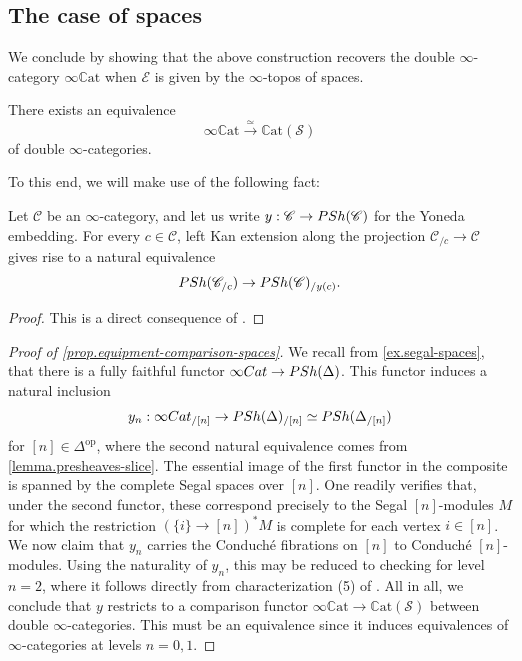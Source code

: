 \documentclass[a4paper, 11pt]{amsart}
\numberwithin{theorem}{section}
\theoremstyle{definition}
\newcommand{\cat}[1]{\textup{#1}}
\newcommand{\op}{\mathrm{op}}
\newcommand{\Cat}{\cat{Cat}}
\renewcommand{\S}{\mathscr{S}}
\newcommand{\C}{\mathscr{C}}
\newcommand{\E}{\mathscr{E}}
\newcommand{\PSh}{\cat{PSh}}
\newcommand{\CCAT}{\mathbb{C}\mathrm{at}}
\begin{document}
\subsection{The case of spaces}
We conclude by showing that the above construction recovers the double $\infty$-category $\infty\CCAT$  when 
 $\E$ is given by the $\infty$-topos of spaces.

\begin{proposition}\label{prop.equipment-comparison-spaces}
	There exists an equivalence 
	$$
	\infty\CCAT \xrightarrow{\simeq} \CCAT(\S)
	$$
	of double $\infty$-categories.
\end{proposition}

To this end, we will make use of the following fact:

\begin{lemma}\label{lemma.presheaves-slice}
Let $\C$ be an $\infty$-category, and let us write $y : \C \to \PSh(\C)$ for the Yoneda embedding.
For every $c \in \C$, left Kan extension along the projection $\C_{/c}\to \C$ gives rise 
to a natural equivalence
$$
\PSh(\C_{/c}) \to \PSh(\C)_{/y(c)}.
$$
\end{lemma}
\begin{proof}
	This is a direct consequence of \cite[Corollary 9.8]{GepnerHaugsengNikolaus}.
\end{proof}

\begin{proof}[Proof of \cref{prop.equipment-comparison-spaces}]
	We recall from \cref{ex.segal-spaces}, that there is a fully faithful functor 
	$\infty\Cat \to \PSh(\Delta)$. This functor induces a natural inclusion
	$$
	y_n : \infty\Cat_{/[n]} \to \PSh(\Delta)_{/[n]} \simeq \PSh(\Delta_{/[n]})
	$$
	for $[n] \in \Delta^\op$, where the second natural equivalence comes from \cref{lemma.presheaves-slice}.
	The essential image of the first functor in the composite is spanned by the complete Segal spaces over $[n]$. 
	One readily verifies that, under the second functor, these correspond precisely to the Segal $[n]$-modules $M$ for which the restriction 
	$(\{i\} \to [n])^*M$ is complete for each vertex $i \in [n]$.
	We now claim that $y_n$ carries the Conduch\'e fibrations on $[n]$ to Conduch\'e $[n]$-modules.  Using the naturality of 
	$y_n$, this may be reduced to checking for level $n=2$, where it follows directly from characterization (5) of \cite[Lemma 5.16]{AyalaFrancisRozenblyum}. 
	All in all, we conclude that $y$ restricts to a comparison functor
	$\infty\CCAT \to \CCAT(\S)$ between double $\infty$-categories. This must be an equivalence since it induces equivalences of $\infty$-categories at levels $n = 0, 1$.
\end{proof}
\end{document}
